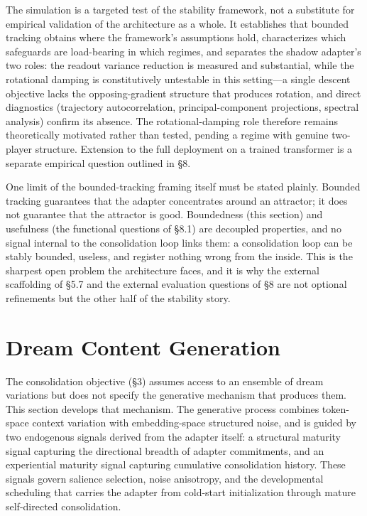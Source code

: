 \documentclass[11pt]{article}
\begin{document}
The simulation is a targeted test of the stability framework, not a substitute for empirical validation of the architecture as a whole. It establishes that bounded tracking obtains where the framework's assumptions hold, characterizes which safeguards are load-bearing in which regimes, and separates the shadow adapter's two roles: the readout variance reduction is measured and substantial, while the rotational damping is constitutively untestable in this setting---a single descent objective lacks the opposing-gradient structure that produces rotation, and direct diagnostics (trajectory autocorrelation, principal-component projections, spectral analysis) confirm its absence. The rotational-damping role therefore remains theoretically motivated rather than tested, pending a regime with genuine two-player structure. Extension to the full deployment on a trained transformer is a separate empirical question outlined in \S 8.

One limit of the bounded-tracking framing itself must be stated plainly. Bounded tracking guarantees that the adapter concentrates around an attractor; it does not guarantee that the attractor is good. Boundedness (this section) and usefulness (the functional questions of \S 8.1) are decoupled properties, and no signal internal to the consolidation loop links them: a consolidation loop can be stably bounded, useless, and register nothing wrong from the inside. This is the sharpest open problem the architecture faces, and it is why the external scaffolding of \S 5.7 and the external evaluation questions of \S 8 are not optional refinements but the other half of the stability story.


\section{Dream Content Generation}

The consolidation objective (\S 3) assumes access to an ensemble of dream variations but does not specify the generative mechanism that produces them. This section develops that mechanism. The generative process combines token-space context variation with embedding-space structured noise, and is guided by two endogenous signals derived from the adapter itself: a structural maturity signal capturing the directional breadth of adapter commitments, and an experiential maturity signal capturing cumulative consolidation history. These signals govern salience selection, noise anisotropy, and the developmental scheduling that carries the adapter from cold-start initialization through mature self-directed consolidation.
\end{document}
